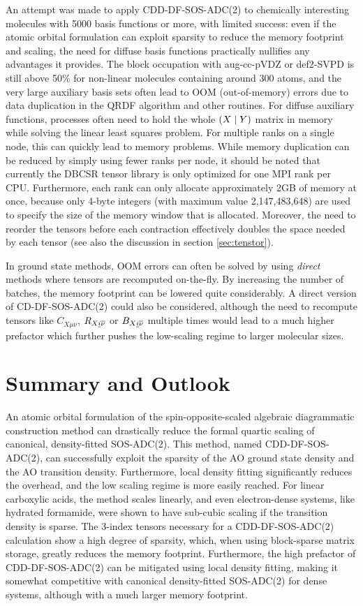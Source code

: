 An attempt was made to apply CDD-DF-SOS-ADC(2) to chemically interesting molecules with 5000 basis functions or more, with limited success: even if the atomic orbital formulation can exploit sparsity to reduce the memory footprint and scaling, the need for diffuse basis functions  practically nullifies any advantages it provides. The block occupation with aug-cc-pVDZ or def2-SVPD is still above 50\% for non-linear molecules containing around 300 atoms, and the very large auxiliary basis sets often lead to OOM (out-of-memory) errors due to data duplication in the QRDF algorithm and other routines. For diffuse auxiliary functions, processes often need to hold the whole $\left( X \mid Y \right)$ matrix in memory while solving the linear least squares problem. For multiple ranks on a single node, this can quickly lead to memory problems. While memory duplication can be reduced by simply using fewer ranks per node, it should be noted that currently the DBCSR tensor library is only optimized for one MPI rank per CPU. Furthermore, each rank can only allocate approximately 2GB of memory at once, because only 4-byte integers (with maximum value 2,147,483,648) are used to specify the size of the memory window that is allocated. Moreover, the need to reorder the tensors before each contraction effectively doubles the space needed by each tensor (see also the discussion in section \ref{sec:tenstor}).

In ground state methods, OOM errors can often be solved by using \emph{direct} methods where tensors are recomputed on-the-fly. By increasing the number of batches, the memory footprint can be lowered quite considerably. A direct version of CD-DF-SOS-ADC(2) could also be considered, although the need to recompute tensors like $C_{X\mu\nu}$, $R_{X\underline{i}\overline{\nu}}$ or $B_{X\underline{i}\overline{\nu}}$ multiple times would lead to a much higher prefactor which further pushes the low-scaling regime to larger molecular sizes.

\section{Summary and Outlook}

An atomic orbital formulation of the spin-opposite-scaled algebraic diagrammatic construction method can drastically reduce the formal quartic scaling of canonical, density-fitted SOS-ADC(2). This method, named CDD-DF-SOS-ADC(2), can successfully exploit the sparsity of the AO ground state density and the AO transition density. Furthermore, local density fitting significantly reduces the overhead, and the low scaling regime is more easily reached. For linear carboxylic acids, the method scales linearly, and even electron-dense systems, like hydrated formamide, were shown to have sub-cubic scaling if the transition density is sparse. The 3-index tensors necessary for a CDD-DF-SOS-ADC(2) calculation show a high degree of sparsity, which, when using block-sparse matrix storage, greatly reduces the memory footprint. Furthermore, the high prefactor of CDD-DF-SOS-ADC(2) can be mitigated using local density fitting, making it somewhat competitive with canonical density-fitted SOS-ADC(2) for dense systems, although with a much larger memory footprint.

